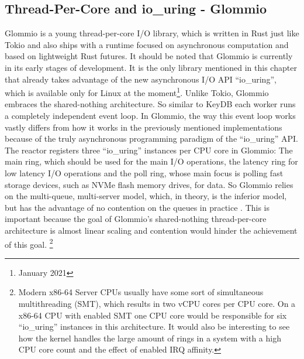 \subsection{Thread-Per-Core and io\_uring - Glommio}
Glommio is a young thread-per-core I/O library, which is written in Rust just like Tokio and also ships with a runtime focused on asynchronous computation and based on lightweight Rust futures. It should be noted that Glommio is currently in its early stages of development. It is the only library mentioned in this chapter that already takes advantage of the new asynchronous I/O API “io\_uring”, which is available only for Linux at the moment\footnote{January 2021}. Unlike Tokio, Glommio embraces the shared-nothing architecture. So similar to KeyDB each worker runs a completely independent event loop. In Glommio, the way this event loop works vastly differs from how it works in the previously mentioned implementations because of the truly asynchronous programming paradigm of the “io\_uring” API. The reactor registers three “io\_uring” instances per CPU core in Glommio: The main ring, which should be used for the main I/O operations, the latency ring for low latency I/O operations and the poll ring, whose main focus is polling fast storage devices, such as NVMe flash memory drives, for data. So Glommio relies on the multi-queue, multi-server model, which, in theory, is the inferior model, but has the advantage of no contention on the queues in practice .  \newline
This is important because the goal of Glommio’s shared-nothing thread-per-core architecture is almost linear scaling and contention would hinder the achievement of this goal. 
\footnote{Modern x86-64 Server CPUs usually have some sort of simultaneous multithreading (SMT), which results in two vCPU cores per CPU core. On a x86-64 CPU with enabled SMT one CPU core would be responsible for six “io\_uring” instances in this architecture. It would also be interesting to see how the kernel handles the large amount of rings in a system with a high CPU core count and the effect of enabled IRQ affinity.}  \newline
